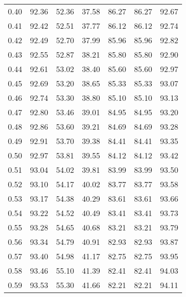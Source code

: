\begin{tabular}{|c|c|c|c|c|c|c|}
      0.40 &     92.36 &     52.36 &      37.58 &   86.27 &      86.27 &         92.67 \\
      0.41 &     92.42 &     52.51 &      37.77 &   86.12 &      86.12 &         92.74 \\
      0.42 &     92.49 &     52.70 &      37.99 &   85.96 &      85.96 &         92.82 \\
      0.43 &     92.55 &     52.87 &      38.21 &   85.80 &      85.80 &         92.90 \\
      0.44 &     92.61 &     53.02 &      38.40 &   85.60 &      85.60 &         92.97 \\
      0.45 &     92.69 &     53.20 &      38.65 &   85.33 &      85.33 &         93.07 \\
      0.46 &     92.74 &     53.30 &      38.80 &   85.10 &      85.10 &         93.13 \\
      0.47 &     92.80 &     53.46 &      39.01 &   84.95 &      84.95 &         93.20 \\
      0.48 &     92.86 &     53.60 &      39.21 &   84.69 &      84.69 &         93.28 \\
      0.49 &     92.91 &     53.70 &      39.38 &   84.41 &      84.41 &         93.35 \\
      0.50 &     92.97 &     53.81 &      39.55 &   84.12 &      84.12 &         93.42 \\
      0.51 &     93.04 &     54.02 &      39.81 &   83.99 &      83.99 &         93.50 \\
      0.52 &     93.10 &     54.17 &      40.02 &   83.77 &      83.77 &         93.58 \\
      0.53 &     93.17 &     54.38 &      40.29 &   83.61 &      83.61 &         93.66 \\
      0.54 &     93.22 &     54.52 &      40.49 &   83.41 &      83.41 &         93.73 \\
      0.55 &     93.28 &     54.65 &      40.68 &   83.21 &      83.21 &         93.79 \\
      0.56 &     93.34 &     54.79 &      40.91 &   82.93 &      82.93 &         93.87 \\
      0.57 &     93.40 &     54.98 &      41.17 &   82.75 &      82.75 &         93.95 \\
      0.58 &     93.46 &     55.10 &      41.39 &   82.41 &      82.41 &         94.03 \\
      0.59 &     93.53 &     55.30 &      41.66 &   82.21 &      82.21 &         94.11 \\

\end{tabular}

